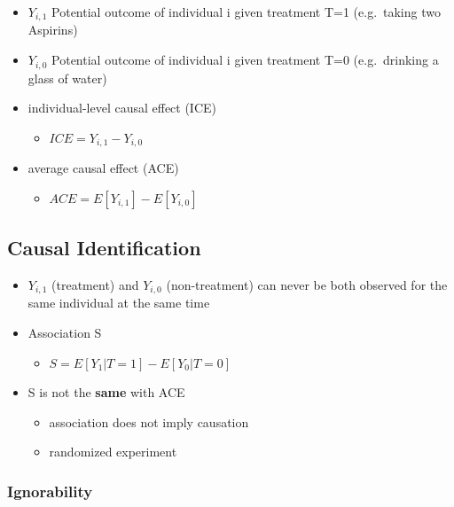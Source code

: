 \documentclass[
]{book}
\providecommand{\tightlist}{%
  \setlength{\itemsep}{0pt}\setlength{\parskip}{0pt}}
\begin{document}
\begin{itemize}
\tightlist
\item
  \(Y_{i,1}\) Potential outcome of individual i given treatment T=1 (e.g.~taking two Aspirins)
\item
  \(Y_{i,0}\) Potential outcome of individual i given treatment T=0 (e.g.~drinking a glass of water)
\item
  individual-level causal effect (ICE)

  \begin{itemize}
  \tightlist
  \item
    \(ICE=Y_{i,1} −Y_{i,0}\)
  \end{itemize}
\item
  average causal effect (ACE)

  \begin{itemize}
  \tightlist
  \item
    \(ACE = E[Y_{i,1}] −E[Y_{i,0}]\)
  \end{itemize}
\end{itemize}

\hypertarget{causal-identification}{%
\subsection{Causal Identification}\label{causal-identification}}

\begin{itemize}
\tightlist
\item
  \(Y_{i,1}\) (treatment) and \(Y_{i,0}\) (non-treatment) can never be both observed for the same individual at the same time
\item
  Association S

  \begin{itemize}
  \tightlist
  \item
    \(S = E[Y_1|T = 1] - E[Y_0|T = 0]\)
  \end{itemize}
\item
  S is not the \textbf{same} with ACE

  \begin{itemize}
  \tightlist
  \item
    association does not imply causation
  \item
    randomized experiment
  \end{itemize}
\end{itemize}

\hypertarget{ignorability}{%
\subsubsection{Ignorability}\label{ignorability}}
\end{document}
